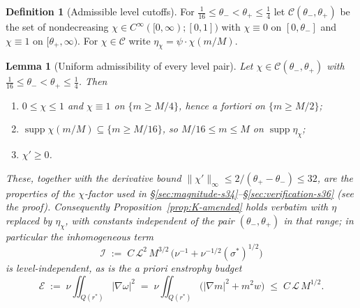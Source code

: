 \documentclass[11pt]{article}
\newtheorem{lemma}[theorem]{Lemma}
\theoremstyle{definition}
\newtheorem{definition}[theorem]{Definition}
\theoremstyle{remark}
\begin{document}
\begin{definition}[Admissible level cutoffs]\label{def:s41-admissible}
  For $\tfrac{1}{16}\leq\theta_-<\theta_+\leq\tfrac14$ let
  $\mathcal{C}(\theta_-,\theta_+)$ be the set of nondecreasing
  $\chi\in C^\infty([0,\infty);[0,1])$ with $\chi\equiv0$ on $[0,\theta_-]$
  and $\chi\equiv1$ on $[\theta_+,\infty)$. For $\chi\in\mathcal{C}$ write
  $\eta_\chi=\psi\cdot\chi(m/M)$.
\end{definition}

\begin{lemma}[Uniform admissibility of every level pair]
  \label{lem:s41-admissible}
  Let $\chi\in\mathcal{C}(\theta_-,\theta_+)$ with
  $\tfrac1{16}\leq\theta_-<\theta_+\leq\tfrac14$. Then
  \begin{enumerate}[label=(\roman*)]
    \item $0\leq\chi\leq1$ and $\chi\equiv1$ on $\{m\geq M/4\}$, hence a
      fortiori on $\{m\geq M/2\}$;
    \item $\operatorname{supp}\chi(m/M)\subseteq\{m\geq M/16\}$, so
      $M/16\leq m\leq M$ on $\operatorname{supp}\eta_\chi$;
    \item $\chi'\geq0$.
  \end{enumerate}
  These, together with the derivative bound
  $\|\chi'\|_\infty\leq2/(\theta_+-\theta_-)\leq32$, are the properties of
  the $\chi$-factor used in
  \S\ref{sec:magnitude-s34}--\S\ref{sec:verification-s36}
  (see the proof). Consequently
  Proposition~\ref{prop:K-amended} holds verbatim with $\eta$ replaced by
  $\eta_\chi$, with constants independent of the pair
  $(\theta_-,\theta_+)$ in that range; in particular the inhomogeneous term
  \begin{equation}\label{eq:s41-I}
    \mathcal{I} \;:=\; C\,\mathcal{L}^2\,M^{3/2}\,
      \bigl(\nu^{-1}+\nu^{-1/2}(\sigma^*)^{1/2}\bigr)
  \end{equation}
  is level-independent, as is the a priori enstrophy budget
  \begin{equation}\label{eq:s41-budget}
    \mathcal{E} \;:=\; \nu\iint_{Q(r^*)}|\nabla\omega|^2
    \;=\; \nu\iint_{Q(r^*)}\bigl(|\nabla m|^2+m^2w\bigr)
    \;\leq\; C\,\mathcal{L}\,M^{1/2}.
  \end{equation}
\end{lemma}
\end{document}
